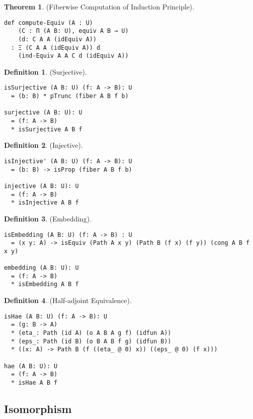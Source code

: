 \documentclass{article}
\theoremstyle{definition}
\newtheorem{definition}{Definition}
\newtheorem{theorem}{Theorem}
\begin{document}
\begin{theorem} (Fiberwise Computation of Induction Principle).
\begin{lstlisting}
def compute-Equiv (A : U)
    (C : Π (A B: U), equiv A B → U)
    (d: C A A (idEquiv A))
  : Ξ (C A A (idEquiv A)) d
    (ind-Equiv A A C d (idEquiv A))
\end{lstlisting}
\end{theorem}

\begin{definition} (Surjective).
\begin{lstlisting}
isSurjective (A B: U) (f: A -> B): U
  = (b: B) * pTrunc (fiber A B f b)

surjective (A B: U): U
  = (f: A -> B)
  * isSurjective A B f
\end{lstlisting}
\end{definition}

\begin{definition} (Injective).
\begin{lstlisting}
isInjective' (A B: U) (f: A -> B): U
  = (b: B) -> isProp (fiber A B f b)

injective (A B: U): U
  = (f: A -> B)
  * isInjective A B f
\end{lstlisting}
\end{definition}

\begin{definition} (Embedding).
\begin{lstlisting}
isEmbedding (A B: U) (f: A -> B) : U
  = (x y: A) -> isEquiv (Path A x y) (Path B (f x) (f y)) (cong A B f x y)

embedding (A B: U): U
  = (f: A -> B)
  * isEmbedding A B f
\end{lstlisting}
\end{definition}

\begin{definition} (Half-adjoint Equivalence).
\begin{lstlisting}
isHae (A B: U) (f: A -> B): U
  = (g: B -> A)
  * (eta_: Path (id A) (o A B A g f) (idfun A))
  * (eps_: Path (id B) (o B A B f g) (idfun B))
  * ((x: A) -> Path B (f ((eta_ @ 0) x)) ((eps_ @ 0) (f x)))

hae (A B: U): U
  = (f: A -> B)
  * isHae A B f
\end{lstlisting}
\end{definition}

\newpage
\subsection{Isomorphism}
\end{document}
